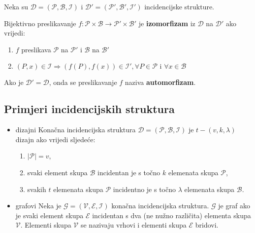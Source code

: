 \bigskip
\noindent
Neka su $\mathcal{D} = (\mathcal{P}, \mathcal{B}, \mathcal{I})$ i
$\mathcal{D}' = (\mathcal{P}', \mathcal{B}', \mathcal{I}')$ incidencijske
strukture.

\noindent
Bijektivno preslikavanje
$f: \mathcal{P} \times \mathcal{B} \to \mathcal{P}' \times \mathcal{B}'$ je
\textbf{izomorfizam} iz $\mathcal{D}$ na $\mathcal{D}'$ ako vrijedi:
\begin{enumerate}
    \item $f$ preslikava $\mathcal{P}$ na $\mathcal{P}'$ i $\mathcal{B}$ na $\mathcal{B}'$
    \item $(P, x) \in \mathcal{I} \Rightarrow (f (P), f (x)) \in \mathcal{I}', \forall P \in \mathcal{P}\text{ i }\forall x \in \mathcal{B}$
\end{enumerate}

Ako je $\mathcal{D}' = \mathcal{D}$, onda se preslikavanje $f$ naziva
\textbf{automorfizam}.

\subsection{Primjeri incidencijskih struktura}

\begin{itemize}
    \item dizajni\newline
    Konačna incidencijska struktura
    $\mathcal{D} = (\mathcal{P}, \mathcal{B}, \mathcal{I})$ je
    $t - (v, k, \lambda)$ dizajn ako vrijedi sljedeće:
    \begin{enumerate}
        \item $|\mathcal{P}| = v$,
        \item svaki element skupa $\mathcal{B}$ incidentan je s točno $k$
        elemenata skupa $\mathcal{P}$,
        \item svakih $t$ elemenata skupa $\mathcal{P}$ incidentno je s točno
        $\lambda$ elemenata skupa $\mathcal{B}$.
    \end{enumerate}
    \item grafovi\newline
    Neka je $\mathcal{G} = (\mathcal{V}, \mathcal{E}, \mathcal{I})$ konačna
    incidencijska struktura. $\mathcal{G}$ je graf ako je svaki element skupa
    $\mathcal{E}$ incidentan s dva (ne nužno različita) elementa skupa
    $\mathcal{V}$. Elementi skupa $\mathcal{V}$ se nazivaju vrhovi i elementi
    skupa $\mathcal{E}$ bridovi.
\end{itemize}
